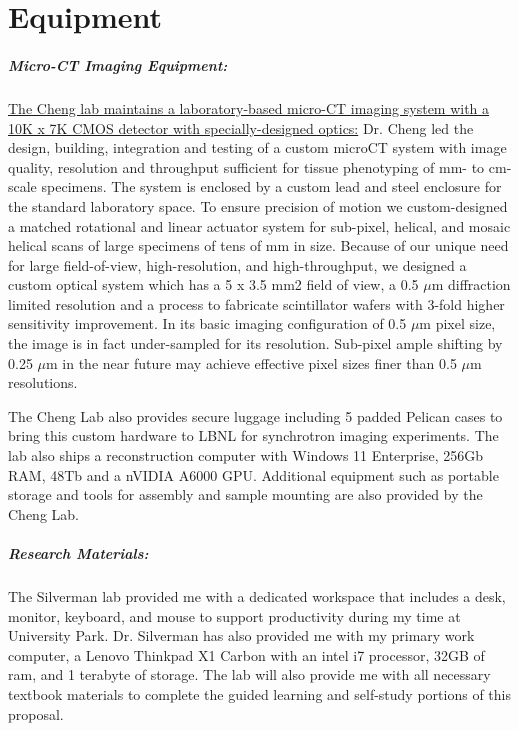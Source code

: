 \documentclass{NIHGrant}
\begin{document}
\part*{Equipment}
\subsubsection*{Micro-CT Imaging Equipment:} \uline{The Cheng lab maintains a laboratory-based micro-CT imaging system with a 10K x 7K CMOS detector with specially-designed optics:} Dr. Cheng led the design, building, integration and testing of a custom microCT system with image quality, resolution and throughput sufficient for tissue phenotyping of mm- to cm-scale specimens. The system is enclosed by a custom lead and steel enclosure for the standard laboratory space. To ensure precision of motion we custom-designed a matched rotational and linear actuator system for sub-pixel, helical, and mosaic helical scans of large specimens of tens of mm in size. Because of our unique need for large field-of-view, high-resolution, and high-throughput, we designed a custom optical system which has a 5 x 3.5 mm2 field of view, a 0.5 $\mu$m diffraction limited resolution and a process to fabricate scintillator wafers with 3-fold higher sensitivity improvement. In its basic imaging configuration of 0.5 $\mu$m pixel size, the image is in fact under-sampled for its resolution. Sub-pixel ample shifting by 0.25 $\mu$m in the near future may achieve effective pixel sizes finer than 0.5 $\mu$m resolutions.

The Cheng Lab also provides secure luggage including 5 padded Pelican cases to bring this custom hardware to LBNL for synchrotron imaging experiments. The lab also ships a reconstruction computer with Windows 11 Enterprise, 256Gb RAM, 48Tb and a nVIDIA A6000 GPU. Additional equipment such as portable storage and tools for assembly and sample mounting are also provided by the Cheng Lab.

\subsubsection*{Research Materials:} The Silverman lab provided me with a dedicated workspace that includes a desk, monitor, keyboard, and mouse to support productivity during my time at University Park. Dr. Silverman has also provided me with my primary work computer, a Lenovo Thinkpad X1 Carbon with an intel i7 processor, 32GB of ram, and 1 terabyte of storage. The lab will also provide me with all necessary textbook materials to complete the guided learning and self-study portions of this proposal.


\end{document}
